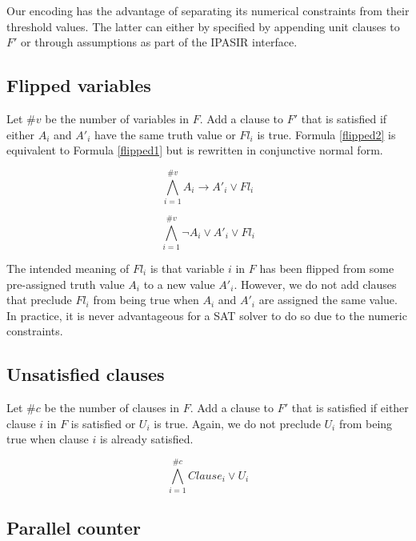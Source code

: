 \documentclass{article}
\begin{document}
\noindent Our encoding has the advantage of separating its numerical
constraints from their threshold values. The latter can either by specified by
appending unit clauses to $F'$ or through assumptions as part of the IPASIR
interface.

\subsection{Flipped variables}

Let $\#v$ be the number of variables in $F$. Add a clause to $F'$ that is
satisfied if either $A_i$ and $A'_i$ have the same truth value or $Fl_i$ is
true. Formula \ref{flipped2} is equivalent to Formula \ref{flipped1} but is
rewritten in conjunctive normal form.

\begin{equation}
  \label{flipped1}
  \bigwedge\limits_{i=1}^{\#v} A_i \to A'_i \lor Fl_i
\end{equation}\break

\begin{equation}
  \label{flipped2}
  \bigwedge\limits_{i=1}^{\#v} \neg{A_i} \lor A'_i \lor Fl_i
\end{equation}\break

\noindent The intended meaning of $Fl_i$ is that variable $i$ in $F$ has been
flipped from some pre-assigned truth value $A_i$ to a new value $A'_i$. However,
we do not add clauses that preclude $Fl_i$ from being true when $A_i$ and $A'_i$
are assigned the same value. In practice, it is never advantageous for a SAT
solver to do so due to the numeric constraints.

\subsection{Unsatisfied clauses}

Let $\#c$ be the number of clauses in $F$. Add a clause to $F'$ that is
satisfied if either clause $i$ in $F$ is satisfied or $U_i$ is true. Again, we
do not preclude $U_i$ from being true when clause $i$ is already satisfied.

\begin{equation}
  \label{unsat}
  \bigwedge\limits_{i=1}^{\#c} Clause_i \lor U_i
\end{equation}\break

\subsection{Parallel counter}
\end{document}
